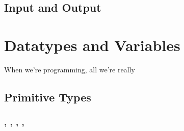 \documentclass{article}
\begin{document}
\subsection{Input and Output}

\section{Datatypes and Variables}

\noindent
When we're programming, all we're really

\subsection{Primitive Types}

\subsubsection{, , , , } 
\end{document}
